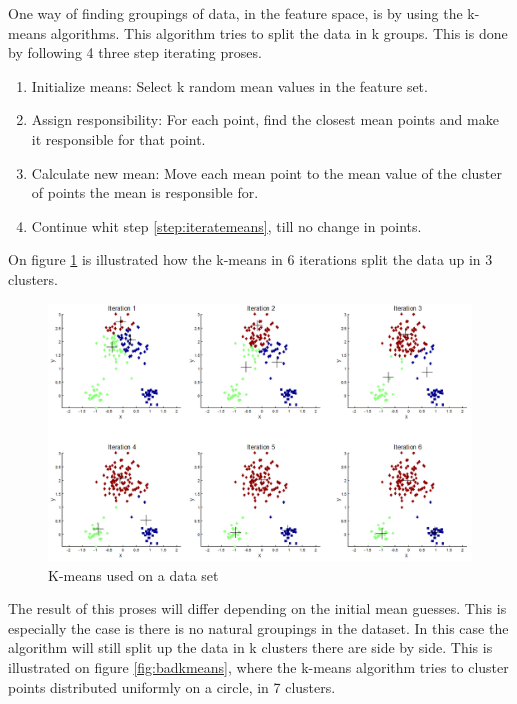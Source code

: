 One way of finding groupings of data, in the feature space, is by using the k-means algorithms. This algorithm tries to split the data in k groups. This is done by following 4 three step iterating proses. 

\begin{enumerate}
  \item Initialize means: Select k random mean values in the feature set. 
  \item Assign responsibility: For each point, find the closest mean points and make it responsible for that point.
  \label{step:iteratemeans} 
  \item Calculate new mean: Move each mean point to the mean value of the cluster of points the mean is responsible for. 
  \item Continue whit step \ref{step:iteratemeans}, till no change in points. 
\end{enumerate}

On figure \ref{fig:kmeans} is illustrated how the k-means in 6 iterations split the data up in 3 clusters.

\begin{figure}[H]
\centering
\includegraphics[scale=0.6]{billeder/kmeansclustering}
\caption{K-means used on a data set}
\label{fig:kmeans}
\end{figure}

The result of this proses will differ depending on the initial mean guesses. This is especially the case is there is no natural groupings in the dataset. In this case the algorithm will still split up the data in k clusters there are side by side. This is illustrated on figure \ref{fig:badkmeans}, where the k-means algorithm tries to cluster points distributed uniformly on a circle, in 7 clusters. 

